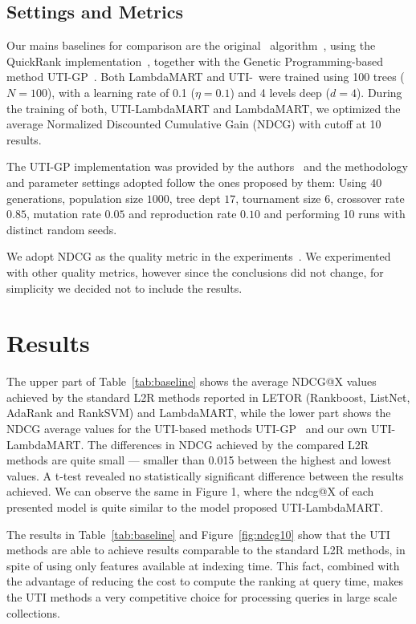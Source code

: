 \documentclass[preprint,review,10pt,3p]{elsarticle}
\begin{document}
\subsection{Settings and Metrics}
\label{sec:lsett}

Our mains baselines for comparison are the original \lambdamart\ algorithm~\cite{wu2010lambdamart}, using the QuickRank implementation~\cite{capannini2016quality}, together with the Genetic Programming-based method UTI-GP~\cite{costa2012lepref}. Both LambdaMART and UTI-\lambdamart\ were trained using 100 trees ($N=100$), with a learning rate of 0.1 ($\eta=0.1$) and 4 levels deep ($d=4$). During the training of both, UTI-LambdaMART and LambdaMART, we optimized the average Normalized Discounted Cumulative Gain (NDCG) with cutoff at 10 results.

The UTI-GP implementation was provided by the authors~\cite{costa2012lepref} and the methodology and parameter settings adopted follow the ones proposed by them: Using $40$ generations, population size $1000$, tree dept $17$, tournament size $6$, crossover rate $0.85$, mutation rate $0.05$ and reproduction rate $0.10$ and performing 10 runs with distinct random seeds. 
 
We adopt NDCG as the quality metric in the experiments~\cite{baezaribeiro2011modinforet}. We experimented with other quality metrics, however since the conclusions did not change, for simplicity we decided not to include the results.

\section{Results}
\label{results}

The upper part of Table~\ref{tab:baseline} shows the average NDCG@X values achieved by the standard L2R methods reported in LETOR (Rankboost, ListNet, AdaRank and RankSVM) and LambdaMART, while the lower part shows the NDCG average values for the UTI-based methods UTI-GP~\cite{costa2012lepref} and our own UTI-LambdaMART. The differences in NDCG achieved by the compared L2R methods are quite small --- smaller than 0.015 between the highest and lowest values. A t-test revealed no statistically significant difference between the results achieved. We can observe the same in Figure 1, where the ndcg@X of each presented model is quite similar to the model proposed UTI-LambdaMART. 

The results in Table~\ref{tab:baseline} and Figure~\ref{fig:ndcg10} show that the UTI methods are able to achieve results comparable to the standard L2R methods, in spite of using only features available at indexing time. This fact, combined with the advantage of reducing the cost to compute the ranking at query time, makes the UTI methods a very competitive choice for processing queries in large scale collections.
\end{document}
